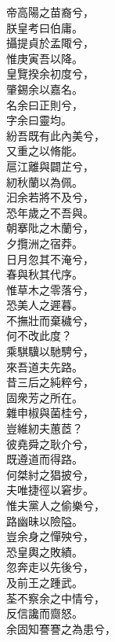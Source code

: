 
\begin{pinyinscope}

\begin{shici}

帝高陽之苗裔兮，\\
朕皇考曰伯庸。\\
攝提貞於孟陬兮，\\
惟庚寅吾以降。\\
皇覽揆余初度兮，\\
肇錫余以嘉名。\\
名余曰正則兮，\\
字余曰靈均。\\
紛吾既有此內美兮，\\
又重之以脩能。\\
扈江離與闢芷兮，\\
紉秋蘭以為佩。\\
汩余若將不及兮，\\
恐年歲之不吾與。\\
朝搴阰之木蘭兮，\\
夕攬洲之宿莽。\\
日月忽其不淹兮，\\
春與秋其代序。\\
惟草木之零落兮，\\
恐美人之遲暮。\\
不撫壯而棄穢兮，\\
何不改此度？\\
乘騏驥以馳騁兮，\\
來吾道夫先路。\\
昔三后之純粹兮，\\
固衆芳之所在。\\
雜申椒與菌桂兮，\\
豈維紉夫蕙茝？\\
彼堯舜之耿介兮，\\
既遵道而得路。\\
何桀紂之猖披兮，\\
夫唯捷徑以窘步。\\
惟夫黨人之偷樂兮，\\
路幽昧以險隘。\\
豈余身之憚殃兮，\\
恐皇輿之敗績。\\
忽奔走以先後兮，\\
及前王之踵武。\\
荃不察余之中情兮，\\
反信讒而齌怒。\\
余固知謇謇之為患兮，\\

\end{shici}
\end{pinyinscope}
